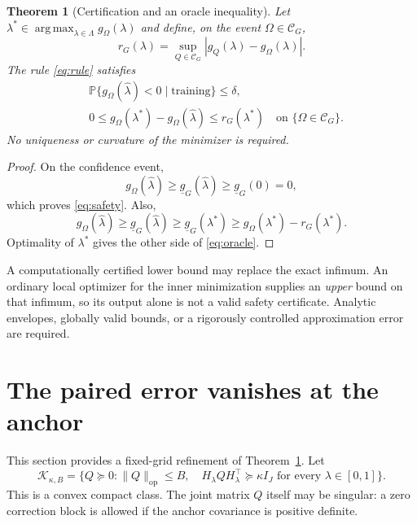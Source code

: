 \documentclass[11pt]{article}
\newtheorem{theorem}{Theorem}
\theoremstyle{remark}\newtheorem{remark}[theorem]{Remark}
\newcommand{\Pp}{\mathbb P}
\newcommand{\op}{\mathrm{op}}
\newcommand{\argmax}{\operatorname*{arg\,max}}
\newcommand{\calC}{\mathcal C}
\begin{document}
\begin{theorem}[Certification and an oracle inequality]\label{thm:certificate}
Let $\lambda^*\in\argmax_{\lambda\in\Lambda}g_\Omega(\lambda)$ and define, on the event $\Omega\in\calC_G$,
\[
 r_G(\lambda)=\sup_{Q\in\calC_G}|g_Q(\lambda)-g_\Omega(\lambda)|.
\]
The rule \eqref{eq:rule} satisfies
\begin{align}
 &\Pp\{g_\Omega(\widehat\lambda)<0\mid\text{training}\}\leq\delta,\label{eq:safety}\\
 &0\leq g_\Omega(\lambda^*)-g_\Omega(\widehat\lambda)\leq r_G(\lambda^*)
 \quad\text{on }\{\Omega\in\calC_G\}.\label{eq:oracle}
\end{align}
No uniqueness or curvature of the minimizer is required.
\end{theorem}
\begin{proof}
On the confidence event,
\[
 g_\Omega(\widehat\lambda)\geq\underline g_G(\widehat\lambda)
 \geq\underline g_G(0)=0,
\]
which proves \eqref{eq:safety}. Also,
\[
 g_\Omega(\widehat\lambda)\geq\underline g_G(\widehat\lambda)
 \geq\underline g_G(\lambda^*)\geq g_\Omega(\lambda^*)-r_G(\lambda^*).
\]
Optimality of $\lambda^*$ gives the other side of \eqref{eq:oracle}.
\end{proof}

A computationally certified lower bound may replace the exact infimum. An ordinary local optimizer for the inner minimization supplies an \emph{upper} bound on that infimum, so its output alone is not a valid safety certificate. Analytic envelopes, globally valid bounds, or a rigorously controlled approximation error are required.

\section{The paired error vanishes at the anchor}
This section provides a fixed-grid refinement of Theorem~\ref{thm:certificate}. Let
\[
 \mathcal K_{\kappa,B}=\{Q\succeq0:\|Q\|_\op\leq B,\quad
 H_\lambda QH_\lambda^\top\succeq\kappa I_J\text{ for every }\lambda\in[0,1]\}.
\]
This is a convex compact class. The joint matrix $Q$ itself may be singular: a zero correction block is allowed if the anchor covariance is positive definite.
\end{document}
